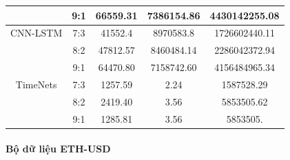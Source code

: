 \documentclass[conference]{IEEEtran}
\begin{document}
\begin{table}[H]
\begin{adjustbox}{width=0.4\textwidth}
\begin{tabular}{|c|c|c|c|c|}
& 9:1 & 66559.31 & 7386154.86 & 4430142255.08 \\ \hline   
CNN-LSTM & 7:3 & 41552.4 & 8970583.8 & 1726602440.11 \\
& 8:2 & 47812.57 & 8460484.14 & 2286042372.94 \\
& 9:1 & 64470.80 & 7158742.60 & 4156484965.34 \\ \hline
TimeNets & 7:3 & 1257.59 & 2.24 & 1587528.29 \\
& 8:2 & 2419.40 & 3.56 & 5853505.62 \\
& 9:1 & 1285.81 & 3.56 & 5853505. \\ \hline
\end{tabular}
\end{adjustbox}
\end{table}
\paragraph{\textbf{Bộ dữ liệu ETH-USD}} \mbox{} \\
\end{document}
